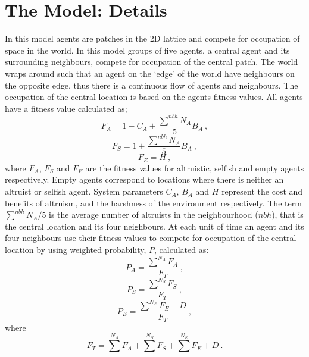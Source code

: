 \documentclass[11pt]{article}
\begin{document}
\section{The Model: Details} 
\label{sec:details}
In this model agents are patches in the 2D lattice and compete for occupation of space in the world. In this  model groups of five agents, a central agent and its surrounding neighbours, compete for occupation of the central patch. The world wraps around such that an agent on the `edge' of the world have neighbours on the opposite edge, thus there is a continuous flow of agents and neighbours. The occupation of the central location is based on the agents fitness values.  All agents have a fitness value calculated as;
	\begin{equation}
		F_A = 1 - C_A + \frac{\sum\limits^{nbh} N_A}{5} B_A~,
	\end{equation}	
	\begin{equation}
		F_S = 1  + \frac{\sum\limits^{nbh} N_A}{5} B_A~,
	\end{equation}
	\begin{equation}
		F_E = H~,
	\end{equation}
	where $F_A$, $F_S$ and $F_E$ are the fitness values for altruistic, selfish and empty agents respectively. Empty agents correspond to locations where there is neither an altruist or selfish agent. System parameters $C_A$, $B_A$ and $H$ represent the cost and benefits of altruism, and the harshness of the environment respectively. The term $\sum\limits^{nbh} N_A / 5$ is the average number of altruists in the neighbourhood ($nbh$), that is the central location and its four neighbours. At each unit of time an agent and its four neighbours use their fitness values to compete for occupation of the central location by using weighted probability, $P$, calculated as:
	\begin{equation}
		P_A = \frac{\sum\limits^{N_A} F_A}{F_T}~,
	\end{equation}	
	\begin{equation}
		P_S = \frac{\sum\limits^{N_S} F_S}{F_T}~,
	\end{equation}		
	\begin{equation}
		P_E = \frac{\sum\limits^{N_E} F_E + D}{F_T}~,
	\end{equation}
	where 
	\begin{equation}
		F_T = \sum\limits^{N_A} F_A + \sum\limits^{N_S} F_S + \sum\limits^{N_E} F_E + D~.
	\end{equation}
\end{document}
